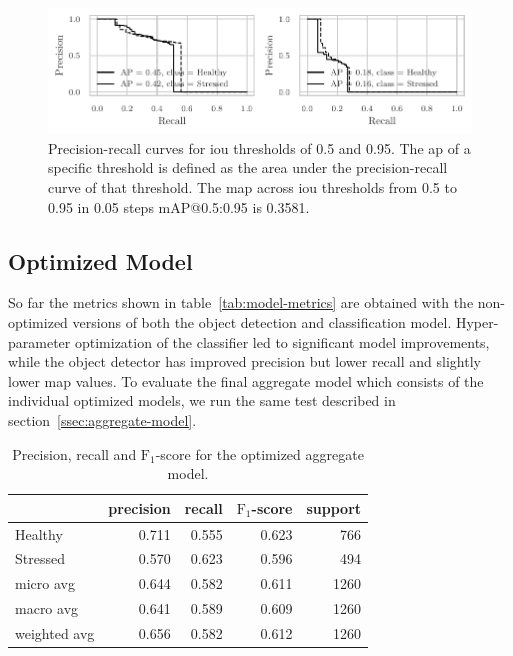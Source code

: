 \documentclass[draft,final]{vutinfth} %
\begin{document}
\begin{figure}
  \centering
  \includegraphics{graphics/APmodel-model-optimized-relabeled.pdf}
  \caption[Aggregate model AP@0.5 and AP@0.95.]{Precision-recall
    curves for \gls{iou} thresholds of 0.5 and 0.95. The \gls{ap} of a
    specific threshold is defined as the area under the
    precision-recall curve of that threshold. The \gls{map} across
    \gls{iou} thresholds from 0.5 to 0.95 in 0.05 steps
    \textsf{mAP}@0.5:0.95 is 0.3581.}
  \label{fig:aggregate-ap}
\end{figure}

\subsection{Optimized Model}
\label{ssec:model-optimized}

So far the metrics shown in table~\ref{tab:model-metrics} are obtained
with the non-optimized versions of both the object detection and
classification model. Hyper-parameter optimization of the classifier
led to significant model improvements, while the object detector has
improved precision but lower recall and slightly lower \gls{map}
values. To evaluate the final aggregate model which consists of the
individual optimized models, we run the same test described in
section~\ref{ssec:aggregate-model}.

\begin{table}
  \centering
  \begin{tabular}{lrrrr}
    \toprule
    {} &  precision &  recall &  $\mathrm{F}_{1}$-score &  support \\
    \midrule
    Healthy      &      0.711 &   0.555 &     0.623 &    766 \\
    Stressed     &      0.570 &   0.623 &     0.596 &    494 \\
    micro avg    &      0.644 &   0.582 &     0.611 &   1260 \\
    macro avg    &      0.641 &   0.589 &     0.609 &   1260 \\
    weighted avg &      0.656 &   0.582 &     0.612 &   1260 \\
    \bottomrule
  \end{tabular}
  \caption{Precision, recall and $\mathrm{F}_1$-score for the
    optimized aggregate model.}
  \label{tab:model-metrics-hyp}
\end{table}
\end{document}
